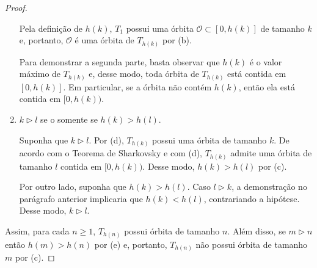 \begin{proof}
\begin{enumerate}[label = (\alph*)]
Pela definição de $h(k)$, $T_1$ possui uma órbita $\mathcal{O} \subset [0, h(k)]$ de tamanho $k$ e, portanto, $\mathcal{O}$ é uma órbita de $T_{h(k)}$ por (b).

Para demonstrar a segunda parte, basta observar que $h(k)$ é o valor máximo de $T_{h(k)}$ e, desse modo, toda órbita de $T_{h(k)}$ está contida em $[0, h(k)]$. Em particular, se a órbita não contém $h(k)$, então ela está contida em $[0, h(k))$.

\item $k \triangleright l$ se o somente se $h(k) > h(l)$.

Suponha que $k \triangleright l$. Por (d), $T_{h(k)}$ possui uma órbita de tamanho $k$. De acordo com o Teorema de Sharkovsky e com (d), $T_{h(k)}$ admite uma órbita de tamanho $l$ contida em $[0, h(k))$. Desse modo,  $h(k) > h(l)$ por (c).

Por outro lado, suponha que $h(k) > h(l)$. Caso $l \triangleright k$, a demonstração no parágrafo anterior implicaria que $h(k) < h(l)$, contrariando a hipótese. Desse modo, $k \triangleright l$.
\end{enumerate}

Assim, para cada $n \geq 1$, $T_{h(n)}$ possui órbita de tamanho $n$. Além disso, se $m \triangleright n$ então $h(m) > h(n)$ por (e) e, portanto, $T_{h(n)}$ não possui órbita de tamanho $m$ por (c).
\end{proof}
